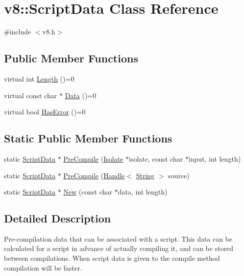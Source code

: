 \hypertarget{classv8_1_1_script_data}{}\section{v8\+:\+:Script\+Data Class Reference}
\label{classv8_1_1_script_data}


{\ttfamily \#include $<$v8.\+h$>$}

\subsection*{Public Member Functions}
\begin{DoxyCompactItemize}
\item 
virtual int \hyperlink{classv8_1_1_script_data_a6aa1007dfe6b09a5e59443bb1afff0b9}{Length} ()=0
\item 
virtual const char $\ast$ \hyperlink{classv8_1_1_script_data_aae01a4e977988fa8338d11d87b572cfa}{Data} ()=0
\item 
virtual bool \hyperlink{classv8_1_1_script_data_ab5cea77b299b7dd73b7024fb114fd7e4}{Has\+Error} ()=0
\end{DoxyCompactItemize}
\subsection*{Static Public Member Functions}
\begin{DoxyCompactItemize}
\item 
static \hyperlink{classv8_1_1_script_data}{Script\+Data} $\ast$ \hyperlink{classv8_1_1_script_data_a0ae4b2c878a42cfea7afcc8898e24cae}{Pre\+Compile} (\hyperlink{classv8_1_1_isolate}{Isolate} $\ast$isolate, const char $\ast$input, int length)
\item 
static \hyperlink{classv8_1_1_script_data}{Script\+Data} $\ast$ \hyperlink{classv8_1_1_script_data_ad1e46f2a1e84ae151b295f3c74c71787}{Pre\+Compile} (\hyperlink{classv8_1_1_handle}{Handle}$<$ \hyperlink{classv8_1_1_string}{String} $>$ source)
\item 
static \hyperlink{classv8_1_1_script_data}{Script\+Data} $\ast$ \hyperlink{classv8_1_1_script_data_a642fc06a9615387f9ac80f264758cc70}{New} (const char $\ast$data, int length)
\end{DoxyCompactItemize}


\subsection{Detailed Description}
Pre-\/compilation data that can be associated with a script. This data can be calculated for a script in advance of actually compiling it, and can be stored between compilations. When script data is given to the compile method compilation will be faster. 

